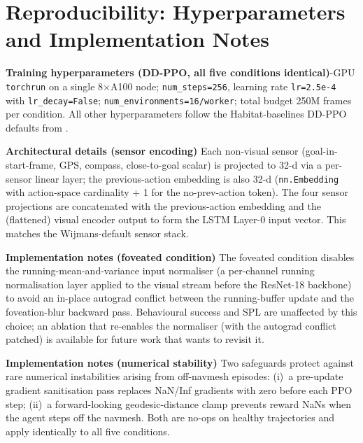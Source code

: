 \documentclass{article}
\begin{document}
\newpage



\newpage


\newpage
\appendix

\section{Reproducibility: Hyperparameters and Implementation Notes}
\label{app:repro}

\noindent\textbf{Training hyperparameters (DD-PPO, all five conditions identical)}-GPU \texttt{torchrun} on a single 8$\times$A100 node; \texttt{num\_steps=256}, learning rate \texttt{lr=2.5e-4} with \texttt{lr\_decay=False}; \texttt{num\_environments=16/worker}; total budget 250M frames per condition. All other hyperparameters follow the Habitat-baselines DD-PPO defaults from \citet{wijmans2020ddppo}.

\noindent\textbf{Architectural details (sensor encoding)}\quad
Each non-visual sensor (goal-in-start-frame, GPS, compass, close-to-goal scalar) is projected to 32-d via a per-sensor linear layer; the previous-action embedding is also 32-d (\texttt{nn.Embedding} with action-space cardinality + 1 for the no-prev-action token). The four sensor projections are concatenated with the previous-action embedding and the (flattened) visual encoder output to form the LSTM Layer-0 input vector. This matches the \citet{wijmans2020ddppo} Wijmans-default sensor stack.

\noindent\textbf{Implementation notes (foveated condition)}\quad
The foveated condition disables the running-mean-and-variance input normaliser (a per-channel running normalisation layer applied to the visual stream before the ResNet-18 backbone) to avoid an in-place autograd conflict between the running-buffer update and the foveation-blur backward pass. Behavioural success and SPL are unaffected by this choice; an ablation that re-enables the normaliser (with the autograd conflict patched) is available for future work that wants to revisit it.

\noindent\textbf{Implementation notes (numerical stability)}\quad
Two safeguards protect against rare numerical instabilities arising from off-navmesh episodes: (i)~a pre-update gradient sanitisation pass replaces NaN/Inf gradients with zero before each PPO step; (ii)~a forward-looking geodesic-distance clamp prevents reward NaNs when the agent steps off the navmesh. Both are no-ops on healthy trajectories and apply identically to all five conditions.
\end{document}
